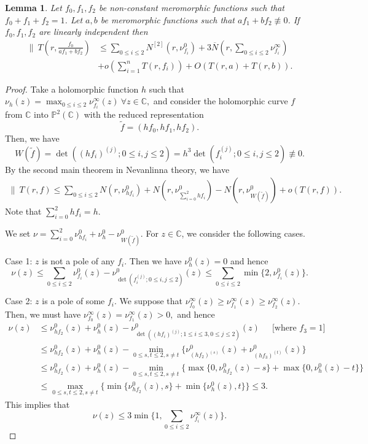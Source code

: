 \documentclass[12pt,leqno]{amsart}
\newtheorem{lemma}[equation]{Lemma}
\newcommand{\C}{{\mathbb{C}}}
\renewcommand{\P}{{\mathbb{P}}}
\numberwithin{equation}{section}
\begin{document}
\begin{lemma}\label{3.7}
Let $f_0, f_1, f_2$ be non-constant meromorphic functions such that $f_0+f_1+f_2=1$. Let $a,b$ be meromorphic functions such that $af_1+bf_2\not\equiv 0$. If $f_0,f_1,f_2$ are linearly independent then
\begin{align*}
\biggl\|\ T\left(r,\frac{f_0}{af_1+bf_2}\right)&\le \sum_{0\le i\le 2}N^{[2]}(r,\nu^0_{f_i})+3\overline N\left(r,\sum_{0\le i\le 2}\nu^\infty_{f_i}\right)\\
&+o(\sum_{i=1}^nT(r,f_i))+O(T(r,a)+T(r,b)).
\end{align*}
\end{lemma}
\begin{proof}
Take a holomorphic function $h$ such that $\nu_h(z)=\max_{0\le i\le 2}\nu^\infty_{f_i}(z)\ \forall z\in\C,$ and 
consider the holomorphic curve $f$ from $\C$ into $\P^2(\C)$ with the reduced representation
$$ \tilde f=(hf_0,hf_1,hf_2).$$ 
Then, we have
$$W(\tilde f)=\det\left((hf_i)^{(j)};0\le i,j\le 2\right)=h^3\det\left(f_i^{(j)};0\le i,j\le 2\right)\not\equiv 0.$$
By the second main theorem in Nevanlinna theory, we have
\begin{align}\label{3.8}
\|\ T(r,f)\le\sum_{0\le i\le 2}N(r,\nu^0_{hf_i})+N(r,\nu^0_{\sum_{i=0}^2hf_i})-N(r,\nu^0_{W(\tilde f)})+o(T(r,f)).
\end{align}
Note that $\sum_{i=0}^2hf_i=h$. 

We set $\nu=\sum_{i=0}^2\nu^0_{hf_i}+\nu^0_h-\nu^0_{W(\tilde f)}$. For $z\in\C$, we consider the following cases.

Case 1: $z$ is not a pole of any $f_i$. Then we have $\nu^0_h(z)=0$ and hence
$$\nu (z)\le \sum_{0\le i\le 2}\nu^0_{f_i}(z)-\nu^0_{\det\left(f_i^{(j)};0\le i,j\le 2\right)}(z)\le\sum_{0\le i\le 2}\min\{2,\nu^0_{f_i}(z)\}.$$
 
Case 2: $z$ is a pole of some $f_i$. We suppose that $\nu^\infty_{f_0}(z)\ge\nu^\infty_{f_1}(z)\ge\nu^\infty_{f_2}(z)$. Then, we must have
$ \nu^\infty_{f_0}(z)=\nu^\infty_{f_1}(z)>0,$ and hence
\begin{align*}
\nu (z)&\le \nu^0_{hf_2}(z)+\nu^0_{h}(z)-\nu^0_{\det\left((hf_i)^{(j)};1\le i\le 3,0\le j\le 2\right)}(z)\ \ \ \ \ \text{ [where $f_3=1$]}\\
&\le \nu^0_{hf_2}(z)+\nu^0_{h}(z)-\min_{0\le s,t\le 2,s\ne t}\{\nu^0_{(hf_2)^{(s)}}(z)+\nu^0_{(hf_3)^{(t)}}(z)\}\\
&\le \nu^0_{hf_2}(z)+\nu^0_{h}(z)-\min_{0\le s,t\le 2,s\ne t}\{\max\{0,\nu^0_{hf_2}(z)-s\}+\max\{0,\nu^0_{h}(z)-t\}\}\\
&\le \max_{0\le s,t\le 2,s\ne t}\{\min\{\nu^0_{hf_2}(z),s\}+\min\{\nu^0_{h}(z),t\}\}\le 3.
\end{align*}
This implies that 
$$\nu(z)\le 3\min\{1,\sum_{0\le i\le 2}\nu^\infty_{f_i}(z)\}.$$


\end{proof}
\end{document}
